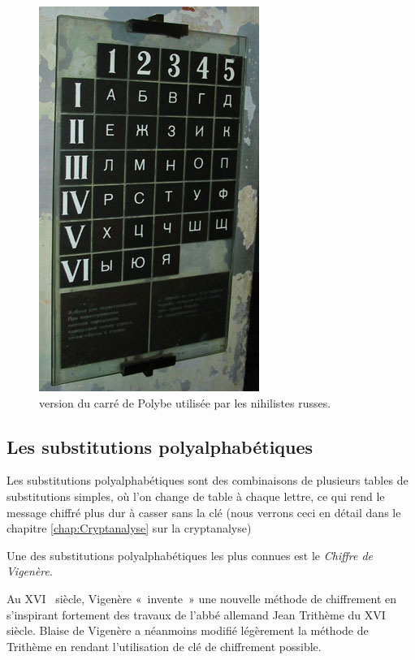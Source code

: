 \begin{figure}[h]
  \begin{center}
    \includegraphics[scale=1.5]{images/Nihilistes.jpg}
  \end{center}
  \caption{version du carré de Polybe utilisée par les nihilistes
    russes.}
  \label{fig:Nihilistes}
\end{figure}

\subsection{Les substitutions polyalphabétiques\label{SubstitutionPolyalphabetique}}
Les substitutions polyalphabétiques sont des combinaisons de plusieurs
tables de substitutions simples, où l'on change de table à chaque
lettre, ce qui rend le message chiffré plus dur à casser sans
la clé (nous verrons ceci en détail dans le chapitre
\ref{chap:Cryptanalyse} sur la crypt\-analyse)

Une des substitutions polyalphabétiques les plus connues est le
\emph{Chiffre de Vigenère}.

\label{syst:ChiffreVigenere}
Au XVI\ieme~ siècle, Vigenère «~invente~» une nouvelle méthode de
chiffrement en s'inspirant fortement des travaux de l'abbé allemand
Jean Trithème du XVI\ieme~ siècle. Blaise de Vigenère a néanmoins
modifié légèrement la méthode de Trithème en rendant l'utilisation de
clé de chiffrement possible.\\

